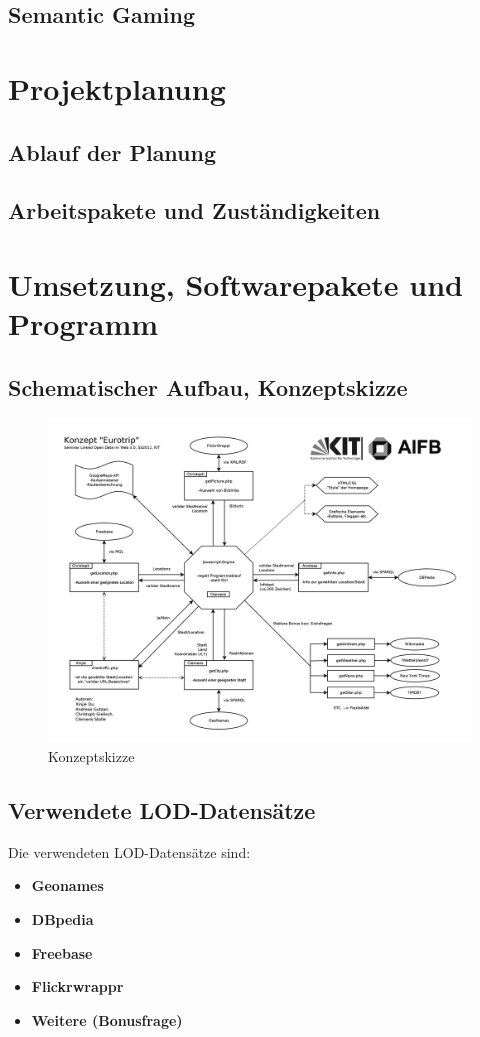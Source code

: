 \documentclass[a4paper, 11pt]{article}
\begin{document}
\subsection{Semantic Gaming}
\newpage
\section{Projektplanung}
\subsection{Ablauf der Planung}
\subsection{Arbeitspakete und Zuständigkeiten}
\newpage
\section{Umsetzung, Softwarepakete und Programm}
\subsection{Schematischer Aufbau, Konzeptskizze}

\begin{figure}
	\centering
	\includegraphics[width=1.4\columnwidth, angle=90]{seminarLOD.png}
	\caption{Konzeptskizze}
	\label{img:grafik-dummy}
\end{figure}

\subsection{Verwendete LOD-Datensätze}
Die verwendeten LOD-Datensätze sind:
\begin{itemize}
\item \textbf{Geonames}
\item \textbf{DBpedia}
\item \textbf{Freebase}
\item \textbf{Flickrwrappr}
\item \textbf{Weitere (Bonusfrage)}
\end{itemize}
\end{document}
